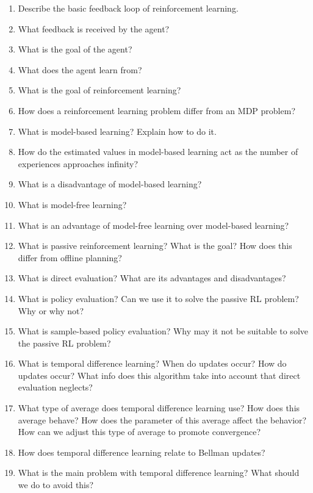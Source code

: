 \documentclass[]{article}
\begin{document}
\begin{enumerate}
\item Describe the basic feedback loop of reinforcement learning.
\item What feedback is received by the agent?
\item What is the goal of the agent?
\item What does the agent learn from? \\

\item What is the goal of reinforcement learning?
\item How does a reinforcement learning problem differ from an MDP problem?\\

\item What is model-based learning? Explain how to do it.
\item How do the estimated values in model-based learning act as the number of experiences approaches infinity?
\item What is a disadvantage of model-based learning?\\

\item What is model-free learning?
\item What is an advantage of model-free learning over model-based learning?\\

\item What is passive reinforcement learning? What is the goal? How does this differ from offline planning?\\

\item What is direct evaluation? What are its advantages and disadvantages? \\

\item What is policy evaluation? Can we use it to solve the passive RL problem? Why or why not?\\

\item What is sample-based policy evaluation? Why may it not be suitable to solve the passive RL problem?\\

\item What is temporal difference learning? When do updates occur? How do updates occur? What info does this algorithm take into account that direct evaluation neglects?
\item What type of average does temporal difference learning use? How does this average behave? How does the parameter of this average affect the behavior? How can we adjust this type of average to promote convergence?
\item How does temporal difference learning relate to Bellman updates?
\item What is the main problem with temporal difference learning? What should we do to avoid this? \\


\end{enumerate}
\end{document}
